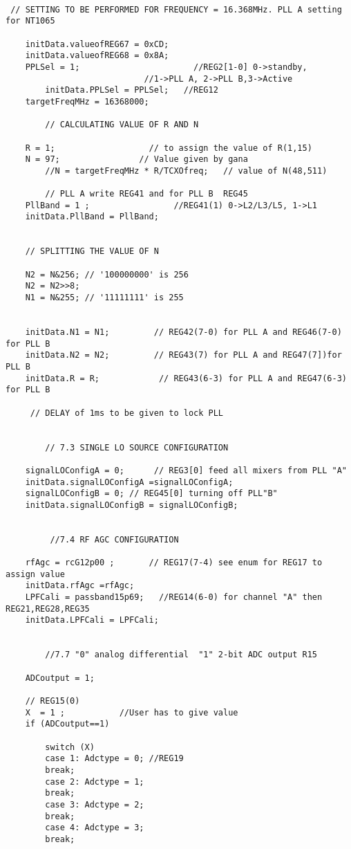 \documentclass[12pt,a4paper,onecolumn]{article}
\begin{document}
\begin{verbatim}

 // SETTING TO BE PERFORMED FOR FREQUENCY = 16.368MHz. PLL A setting for NT1065

	initData.valueofREG67 = 0xCD;
	initData.valueofREG68 = 0x8A;
	PPLSel = 1;                       //REG2[1-0] 0->standby, 
					        //1->PLL A, 2->PLL B,3->Active
        initData.PPLSel = PPLSel;   //REG12
	targetFreqMHz = 16368000; 
  
        // CALCULATING VALUE OF R AND N 	

	R = 1;                   // to assign the value of R(1,15)
	N = 97;                // Value given by gana
    	//N = targetFreqMHz * R/TCXOfreq;   // value of N(48,511)
	
        // PLL A write REG41 and for PLL B  REG45
	PllBand = 1 ;                 //REG41(1) 0->L2/L3/L5, 1->L1 
	initData.PllBand = PllBand; 


	// SPLITTING THE VALUE OF N 

	N2 = N&256; // '100000000' is 256
	N2 = N2>>8;
	N1 = N&255; // '11111111' is 255
	

	initData.N1 = N1;         // REG42(7-0) for PLL A and REG46(7-0) for PLL B
	initData.N2 = N2;         // REG43(7) for PLL A and REG47(7])for PLL B
	initData.R = R;            // REG43(6-3) for PLL A and REG47(6-3) for PLL B

     // DELAY of 1ms to be given to lock PLL


        // 7.3 SINGLE LO SOURCE CONFIGURATION
	
	signalLOConfigA = 0;      // REG3[0] feed all mixers from PLL "A" 
	initData.signalLOConfigA =signalLOConfigA;
	signalLOConfigB = 0; // REG45[0] turning off PLL"B"
	initData.signalLOConfigB = signalLOConfigB;


         //7.4 RF AGC CONFIGURATION 

	rfAgc = rcG12p00 ;       // REG17(7-4) see enum for REG17 to assign value 
	initData.rfAgc =rfAgc;	
	LPFCali = passband15p69;   //REG14(6-0) for channel "A" then REG21,REG28,REG35
	initData.LPFCali = LPFCali;


        //7.7 "0" analog differential  "1" 2-bit ADC output R15 
 
	ADCoutput = 1; 

	// REG15(0)
	X  = 1 ;           //User has to give value
	if (ADCoutput==1)
		
		switch (X)
		case 1: Adctype = 0; //REG19
		break;
		case 2: Adctype = 1;
		break;
		case 3: Adctype = 2;
		break;
		case 4: Adctype = 3;
		break;
	



\end{verbatim}
\end{document}
